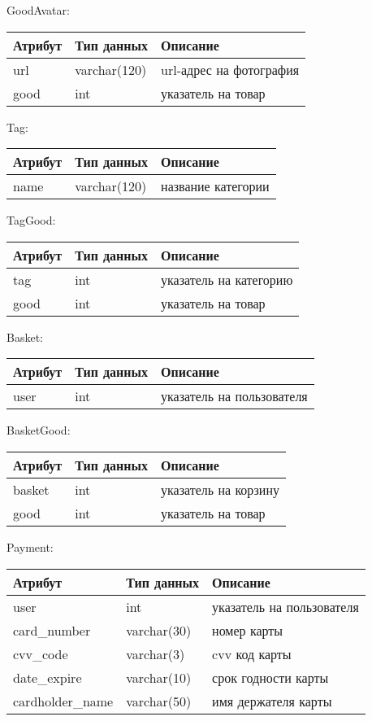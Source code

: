 GoodAvatar:
\bigbreak
\begin{tabular}{ | l | l | l | }
    \hline
    Атрибут & Тип данных & Описание  \\ \hline
    url & varchar(120) & url-адрес на фотография \\ \hline
    good & int & указатель на товар \\
    \hline
\end{tabular}
\bigbreak

Tag:
\bigbreak
\begin{tabular}{ | l | l | l | }
    \hline
    Атрибут & Тип данных & Описание  \\ \hline
    name & varchar(120) & название категории \\
    \hline
\end{tabular}
\bigbreak

TagGood:
\bigbreak
\begin{tabular}{ | l | l | l | }
    \hline
    Атрибут & Тип данных & Описание  \\ \hline
    tag & int & указатель на категорию \\ \hline
    good & int & указатель на товар \\
    \hline
\end{tabular}
\bigbreak

Basket:
\bigbreak
\begin{tabular}{ | l | l | l | }
    \hline
    Атрибут & Тип данных & Описание  \\ \hline
    user & int & указатель на пользователя \\
    \hline
\end{tabular}
\bigbreak

BasketGood:
\bigbreak
\begin{tabular}{ | l | l | l | }
    \hline
    Атрибут & Тип данных & Описание  \\ \hline
    basket & int & указатель на корзину \\ \hline
    good & int & указатель на товар \\
    \hline
\end{tabular}
\bigbreak

Payment:
\bigbreak
\begin{tabular}{ | l | l | l | }
    \hline
    Атрибут & Тип данных & Описание  \\ \hline
    user & int & указатель на пользователя \\ \hline
    card\_number & varchar(30) & номер карты \\ \hline
    cvv\_code & varchar(3) & cvv код карты \\ \hline
    date\_expire & varchar(10) & срок годности карты \\ \hline
    cardholder\_name & varchar(50) & имя держателя карты \\
    \hline
\end{tabular}
\bigbreak

